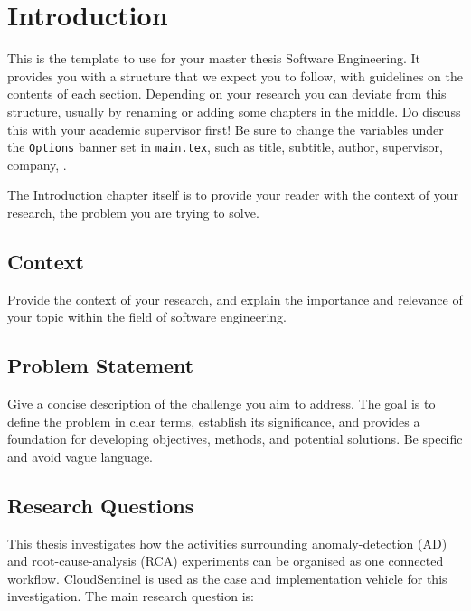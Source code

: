 \chapter{Introduction}\label{ch:introduction}
This is the template to use for your master thesis Software Engineering.
It provides you with a structure that we expect you to follow, with guidelines on the contents of each section.
Depending on your research you can deviate from this structure, usually by renaming or adding some chapters in the middle.
Do discuss this with your academic supervisor first!
Be sure to change the variables under the \verb|Options| banner set in \verb|main.tex|, such as title, subtitle, author, supervisor, company, \etc{}.

The Introduction chapter itself is to provide your reader with the context of your research, the problem you are trying to solve.

\section{Context}
Provide the context of your research, and explain the importance and relevance of your topic within the field of software engineering.


\section{Problem Statement}
Give a concise description of the challenge you aim to address.
The goal is to define the problem in clear terms, establish its significance, and provides a foundation for developing objectives, methods, and potential solutions.
Be specific and avoid vague language. 


\section{Research Questions}
This thesis investigates how the activities surrounding anomaly-detection (AD) and root-cause-analysis (RCA) experiments can be organised as one connected workflow. CloudSentinel is used as the case and implementation vehicle for this investigation. The main research question is:

